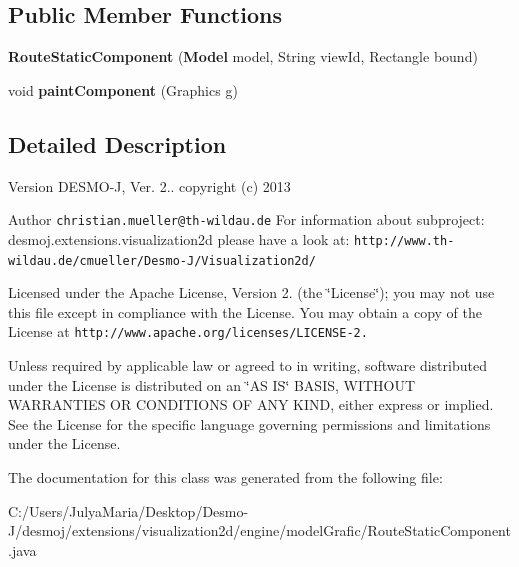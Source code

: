 \subsection*{Public Member Functions}
\begin{DoxyCompactItemize}
\item 
{\bfseries Route\-Static\-Component} ({\bf Model} model, String view\-Id, Rectangle bound)\label{classdesmoj_1_1extensions_1_1visualization2d_1_1engine_1_1model_grafic_1_1_route_static_component_acbb135363237a64b3cead5a559a3e77f}

\item 
void {\bfseries paint\-Component} (Graphics g)\label{classdesmoj_1_1extensions_1_1visualization2d_1_1engine_1_1model_grafic_1_1_route_static_component_ab1647985bcb13fc36c65f1b5dbd852d6}

\end{DoxyCompactItemize}


\subsection{Detailed Description}
\begin{DoxyVersion}{Version}
D\-E\-S\-M\-O-\/\-J, Ver. 2.. copyright (c) 2013 
\end{DoxyVersion}
\begin{DoxyAuthor}{Author}
{\tt christian.\-mueller@th-\/wildau.\-de} For information about subproject\-: desmoj.\-extensions.\-visualization2d please have a look at\-: {\tt http\-://www.\-th-\/wildau.\-de/cmueller/\-Desmo-\/\-J/\-Visualization2d/}
\end{DoxyAuthor}
Licensed under the Apache License, Version 2. (the \char`\"{}\-License\char`\"{}); you may not use this file except in compliance with the License. You may obtain a copy of the License at {\tt http\-://www.\-apache.\-org/licenses/\-L\-I\-C\-E\-N\-S\-E-\/2.}

Unless required by applicable law or agreed to in writing, software distributed under the License is distributed on an \char`\"{}\-A\-S I\-S\char`\"{} B\-A\-S\-I\-S, W\-I\-T\-H\-O\-U\-T W\-A\-R\-R\-A\-N\-T\-I\-E\-S O\-R C\-O\-N\-D\-I\-T\-I\-O\-N\-S O\-F A\-N\-Y K\-I\-N\-D, either express or implied. See the License for the specific language governing permissions and limitations under the License. 

The documentation for this class was generated from the following file\-:\begin{DoxyCompactItemize}
\item 
C\-:/\-Users/\-Julya\-Maria/\-Desktop/\-Desmo-\/\-J/desmoj/extensions/visualization2d/engine/model\-Grafic/Route\-Static\-Component.\-java\end{DoxyCompactItemize}
